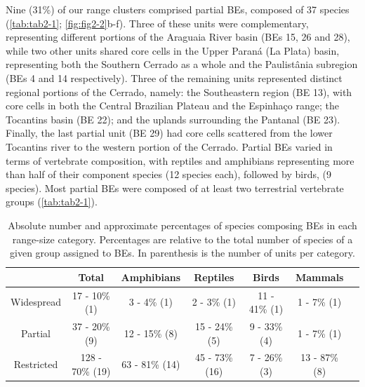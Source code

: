 \documentclass[12pt,openright,oneside,a4paper,english]{abntex2}
\begin{document}
Nine (31\%) of our range clusters comprised partial BEs, composed of 37 species (\autoref{tab:tab2-1}; \autoref{fig:fig2-2}b-f). Three of these units were complementary, representing different portions of the Araguaia River basin (BEs 15, 26 and 28), while two other units shared core cells in the Upper Paraná (La Plata) basin, representing both the Southern Cerrado as a whole and the Paulistânia subregion (BEs 4 and 14 respectively). Three of the remaining units represented distinct regional portions of the Cerrado, namely: the Southeastern region (BE 13), with core cells in both the Central Brazilian Plateau and the Espinhaço range; the Tocantins basin (BE 22); and the uplands surrounding the Pantanal (BE 23). Finally, the last partial unit (BE 29) had core cells scattered from the lower Tocantins river to the western portion of the Cerrado. Partial BEs varied in terms of vertebrate composition, with reptiles and amphibians representing more than half of their component species (12 species each), followed by birds, (9 species). Most partial BEs were composed of at least two terrestrial vertebrate groups (\autoref{tab:tab2-1}).

\begin{table}[h]
	\centering
	\caption[Terrestrial vertebrate classes proportion in Biotic Elements (BEs) range-size categories]{\small Absolute number and approximate percentages of species composing BEs in each range-size category. Percentages are relative to the total number of species of a given group assigned to BEs. In parenthesis is the number of units per category.}
	\label{tab:tab2-2}
	\vspace{\bigskipamount}
	\footnotesize
	\begin{tabular}{c c c c c c c}
		\hline
		& Total & Amphibians & Reptiles  & Birds & Mammals\\
		\hline
		Widespread & 17 - 10\% (1) & 3 - 4\% (1)  & 2 - 3\% (1) & 11 - 41\% (1) & 1 - 7\% (1)\\
		Partial & 37 - 20\% (9) & 12 - 15\% (8) & 15 - 24\% (5)  & 9 - 33\% (4) & 1 - 7\% (1)\\
		Restricted & 128 - 70\% (19) & 63 - 81\% (14) & 45 - 73\% (16) & 7 - 26\% (3) & 13 - 87\% (8)\\
		\hline
	\end{tabular}
\end{table}
\end{document}
